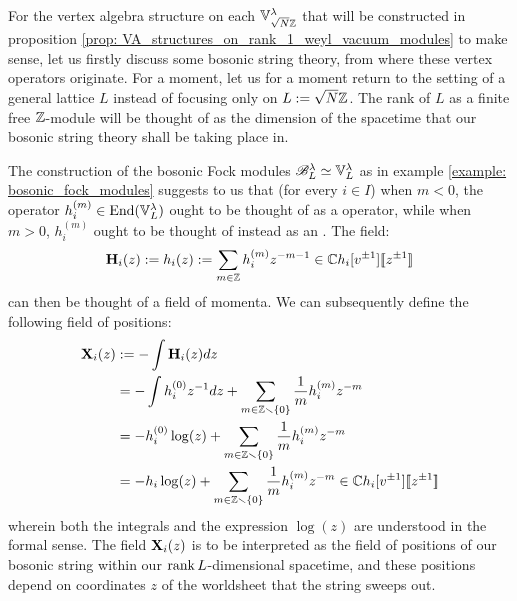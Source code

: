         For the vertex algebra structure on each $\mathbb{V}_{\sqrt{N} \mathbb{Z}}^{\lambda}$ that will be constructed in proposition \ref{prop: VA_structures_on_rank_1_weyl_vacuum_modules} to make sense, let us firstly discuss some bosonic string theory, from where these vertex operators originate. For a moment, let us for a moment return to the setting of a general lattice $L$ instead of focusing only on $L := \sqrt{N} \mathbb{Z}$. The rank of $L$ as a finite free $\mathbb{Z}$-module will be thought of as the dimension of the spacetime that our bosonic string theory shall be taking place in. 

        The construction of the bosonic Fock modules $\mathscr{B}_L^{\lambda} \simeq \mathbb{V}_L^{\lambda}$ as in example \ref{example: bosonic_fock_modules} suggests to us that (for every $i \in I$) when $m < 0$, the operator $h_i^{(m)} \in \mathrm{End}(\mathbb{V}_L^{\lambda})$ ought to be thought of as a  operator, while when $m > 0$, $h_i^{(m)}$ ought to be thought of instead as an . The field:
            $$\mathbf{H}_i(z) := h_i(z) := \sum_{m \in \mathbb{Z}} h_i^{(m)} z^{-m - 1} \in \mathbb{C} h_i[v^{\pm 1}][\![z^{\pm 1}]\!]$$
        can then be thought of a field of momenta. We can subsequently define the following field of positions:
            $$
                \begin{aligned}
                    \mathbf{X}_i(z) & := -\int \mathbf{H}_i(z) dz
                    \\
                    & = -\int h_i^{(0)} z^{-1} dz + \sum_{m \in \mathbb{Z} \smallsetminus \{0\}} \frac1m h_i^{(m)} z^{-m}
                    \\
                    & = -h_i^{(0)} \log(z) + \sum_{m \in \mathbb{Z} \smallsetminus \{0\}} \frac1m h_i^{(m)} z^{-m}
                    \\
                    & = -h_i \log(z) + \sum_{m \in \mathbb{Z} \smallsetminus \{0\}} \frac1m h_i^{(m)} z^{-m} \in \mathbb{C} h_i[v^{\pm 1}][\![z^{\pm 1}]\!]
                \end{aligned}
            $$
        wherein both the integrals and the expression $\log(z)$ are understood in the formal sense. The field $\mathbf{X}_i(z)$ is to be interpreted as the field of positions of our bosonic string within our $\operatorname{rank} L$-dimensional spacetime, and these positions depend on coordinates $z$ of the worldsheet that the string sweeps out.
        

